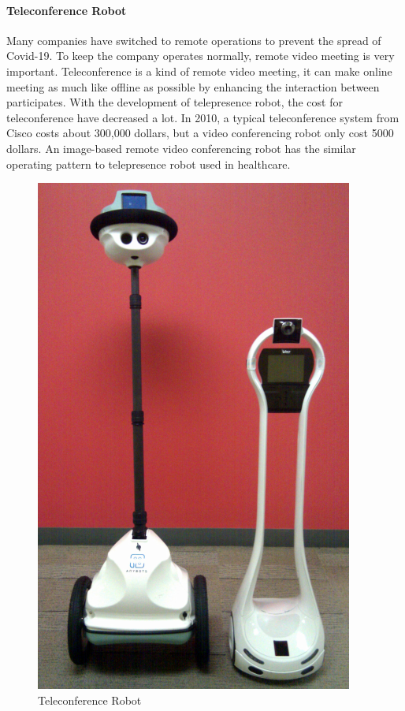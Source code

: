 \documentclass[a4paper]{article}
\begin{document}
\paragraph{Teleconference Robot}
    Many companies have switched to remote operations to prevent the spread of Covid-19. To keep the company operates normally, remote video meeting is very important. Teleconference is a kind of remote video meeting, it can make online meeting as much like offline as possible by enhancing the interaction between participates. With the development of telepresence robot, the cost for teleconference have decreased a lot. In 2010, a typical teleconference system from Cisco costs about 300,000 dollars\cite{40}, but a video conferencing robot only cost 5000 dollars\cite{41}. An image-based remote video conferencing robot has the similar operating pattern to telepresence robot used in healthcare.
\begin{figure}[H]
    \centering
    \includegraphics[scale=0.25]{Teleconference.png}
    \caption{Teleconference Robot}
    \label{Teleconference}
\end{figure}
\end{document}
